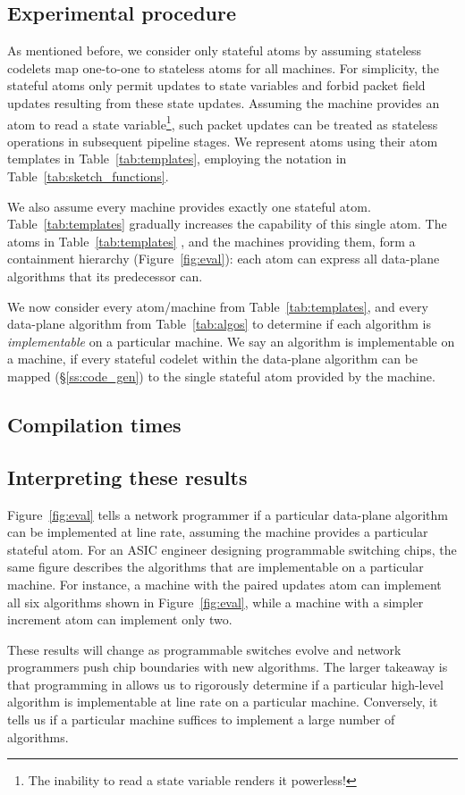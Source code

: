 \subsection{Experimental procedure}
As mentioned before, we consider only stateful atoms by assuming stateless
codelets map one-to-one to stateless atoms for all \absmachine machines. For
simplicity, the stateful atoms only permit updates to state variables and
forbid packet field updates resulting from these state updates.  Assuming the
\absmachine machine provides an atom to read a state variable\footnote{The
inability to read a state variable renders it powerless!}, such packet updates
can be treated as stateless operations in subsequent pipeline stages. We
represent atoms using their atom templates in Table~\ref{tab:templates},
employing the notation in Table~\ref{tab:sketch_functions}.

We also assume every \absmachine machine provides exactly one stateful atom.
Table~\ref{tab:templates} gradually increases the capability of this single
atom.  The atoms in Table~\ref{tab:templates} , and the \absmachine machines
providing them, form a containment hierarchy (Figure~\ref{fig:eval}): each atom
can express all data-plane algorithms that its predecessor can.

We now consider every atom/\absmachine machine from Table~\ref{tab:templates},
and every data-plane algorithm from Table~\ref{tab:algos} to determine if each
algorithm is \textit{implementable} on a particular \absmachine machine. We
say an algorithm is implementable on a \absmachine machine, if every stateful
codelet within the data-plane algorithm can be mapped (\S\ref{ss:code_gen}) to
the single stateful atom provided by the \absmachine machine.

\subsection{Compilation times}

\subsection{Interpreting these results}
Figure~\ref{fig:eval} tells a network programmer if a particular data-plane
algorithm can be implemented at line rate, assuming the \absmachine machine
provides a particular stateful atom. For an ASIC engineer designing
programmable switching chips, the same figure describes the algorithms that are
implementable on a particular \absmachine machine. For instance, a \absmachine
machine with the paired updates atom can implement all six algorithms shown in
Figure~\ref{fig:eval}, while a machine with a simpler increment atom can
implement only two.

These results will change as programmable switches evolve and network
programmers push chip boundaries with new algorithms.  The larger takeaway is
that programming in \pktlanguage allows us to rigorously determine if a
particular high-level algorithm is implementable at line rate on a particular
\absmachine machine. Conversely, it tells us if a particular \absmachine
machine suffices to implement a large number of algorithms.
